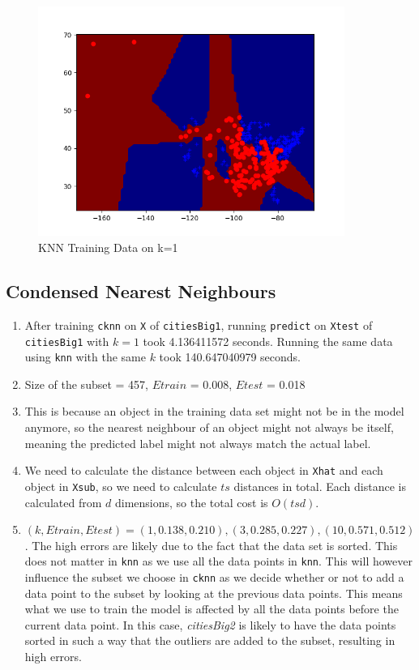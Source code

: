 \documentclass{article}
\def\enum#1{\begin{enumerate}#1\end{enumerate}}
\begin{document}
\begin{figure}[h!]
  \includegraphics[height=7.5cm]{knn_train_data_k=1.png}
  \caption{KNN Training Data on k=1}
  \label{fig: knn}
\end{figure}

\subsection{Condensed Nearest Neighbours}

\enum{
	\item After training \texttt{cknn} on \texttt{X} of \texttt{citiesBig1}, running \texttt{predict} on \texttt{Xtest} of \texttt{citiesBig1} with $k = 1$ took 4.136411572 seconds. Running the same data using \texttt{knn} with the same $k$ took 140.647040979 seconds.
	\item Size of the subset = 457, $Etrain$ = 0.008, $Etest$ = 0.018
	\item This is because an object in the training data set might not be in the model anymore, so the nearest neighbour of an object might not always be itself, meaning the predicted label might not always match the actual label.
	\item We need to calculate the distance between each object in \texttt{Xhat} and each object in \texttt{Xsub}, so we need to calculate $ts$ distances in total. Each distance is calculated from $d$ dimensions, so the total cost is $O(tsd)$.
    \item $(k, Etrain, Etest) = (1, 0.138, 0.210), (3, 0.285, 0.227), (10, 0.571, 0.512)$. The high errors are likely due to the fact that the data set is sorted. This does not matter in \texttt{knn} as we use all the data points in \texttt{knn}. This will however influence the subset we choose in \texttt{cknn} as we decide whether or not to add a data point to the subset by looking at the previous data points. This means what we use to train the model is affected by all the data points before the current data point. In this case, \textit{citiesBig2} is likely to have the data points sorted in such a way that the outliers are added to the subset, resulting in high errors.
}
\end{document}
